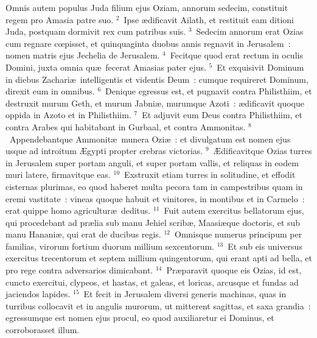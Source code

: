\lettrine[lines=10,image=true,loversize=0.05,lraise=-0.03]{O}{}mnis autem populus Juda filium ejus Oziam, annorum sedecim, constituit regem pro Amasia patre suo.
${}^{2}$~Ipse \ae dificavit Ailath, et restituit eam ditioni Juda, postquam dormivit rex cum patribus suis.
${}^{3}$~Sedecim annorum erat Ozias cum regnare cœpisset, et quinquaginta duobus annis regnavit in Jerusalem~: nomen matris ejus Jechelia de Jerusalem.
${}^{4}$~Fecitque quod erat rectum in oculis Domini, juxta omnia qu\ae\ fecerat Amasias pater ejus.
${}^{5}$~Et exquisivit Dominum in diebus Zachari\ae\ intelligentis et videntis Deum~: cumque requireret Dominum, direxit eum in omnibus.
${}^{6}$~Denique egressus est, et pugnavit contra Philisthiim, et destruxit murum Geth, et murum Jabni\ae , murumque Azoti~: \ae dificavit quoque oppida in Azoto et in Philisthiim.
${}^{7}$~Et adjuvit eum Deus contra Philisthiim, et contra Arabes qui habitabant in Gurbaal, et contra Ammonitas.
${}^{8}$~Appendebantque Ammonit\ae\ munera Ozi\ae~: et divulgatum est nomen ejus usque ad introitum \AE gypti propter crebras victorias.
${}^{9}$~\AE dificavitque Ozias turres in Jerusalem super portam anguli, et super portam vallis, et reliquas in eodem muri latere, firmavitque eas.
${}^{10}$~Exstruxit etiam turres in solitudine, et effodit cisternas plurimas, eo quod haberet multa pecora tam in campestribus quam in eremi vastitate~: vineas quoque habuit et vinitores, in montibus et in Carmelo~: erat quippe homo agricultur\ae\ deditus.
${}^{11}$~Fuit autem exercitus bellatorum ejus, qui procedebant ad pr\ae lia sub manu Jehiel scrib\ae , Maasi\ae que doctoris, et sub manu Hanani\ae , qui erat de ducibus regis.
${}^{12}$~Omnisque numerus principum per familias, virorum fortium duorum millium sexcentorum.
${}^{13}$~Et sub eis universus exercitus trecentorum et septem millium quingentorum, qui erant apti ad bella, et pro rege contra adversarios dimicabant.
${}^{14}$~Pr\ae paravit quoque eis Ozias, id est, cuncto exercitui, clypeos, et hastas, et galeas, et loricas, arcusque et fundas ad jaciendos lapides.
${}^{15}$~Et fecit in Jerusalem diversi generis machinas, quas in turribus collocavit et in angulis murorum, ut mitterent sagittas, et saxa grandia~: egressumque est nomen ejus procul, eo quod auxiliaretur ei Dominus, et corroborasset illum.


